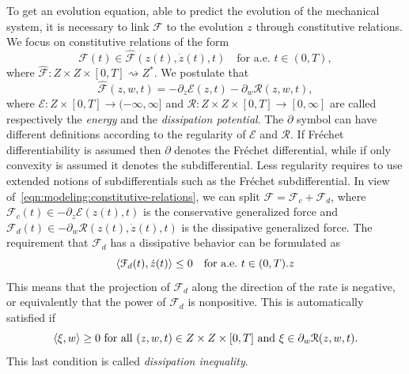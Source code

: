 \documentclass[a4paper,10pt,oneside]{amsbook}
\numberwithin{section}{chapter}
\numberwithin{equation}{chapter}
\theoremstyle{definition}
\DeclarePairedDelimiter{\dual}{\langle}{\rangle}
\begin{document}
To get an evolution equation, able to predict the evolution of the mechanical system, it is necessary to link $\mathcal{F}$ to the evolution $z$ through constitutive relations. We focus on constitutive relations of the form
\[
\mathcal{F}(t)\in\hat{\mathcal{F}}(z(t),\dot{z}(t),t)\quad\text{for a.e.\ $t\in(0,T)$},
\]
where $\hat{\mathcal{F}}\colon Z\times Z\times[0,T]\rightsquigarrow Z^*$. We postulate that
\begin{equation}
\label{eqn:modeling:constitutive-relations}
\hat{\mathcal{F}}(z,w,t)=-\partial_z\mathcal{E}(z,t)-\partial_w\mathcal{R}(z,w,t),
\end{equation}
where $\mathcal{E}\colon Z\times[0,T]\to(-\infty,\infty]$ and $\mathcal{R}\colon Z\times Z\times[0,T]\to[0,\infty]$ are called respectively the \emph{energy} and the \emph{dissipation potential}. The $\partial$ symbol can have different definitions according to the regularity of $\mathcal{E}$ and $\mathcal{R}$. If Fréchet differentiability is assumed then $\partial$ denotes the Fréchet differential, while if only convexity is assumed it denotes the subdifferential. Less regularity requires to use extended notions of subdifferentials such as the Fréchet subdifferential. In view of~\eqref{eqn:modeling:constitutive-relations}, we can split $\mathcal{F}=\mathcal{F}_c+\mathcal{F}_d$, where $\mathcal{F}_c(t)\in-\partial_z\mathcal{E}(z(t),t)$ is the conservative generalized force and $\mathcal{F}_d(t)\in-\partial_w\mathcal{R}(z(t),\dot{z}(t),t)$ is the dissipative generalized force. The requirement that $\mathcal{F}_d$ has a dissipative behavior can be formulated as
\[
\dual{\mathcal{F}_d(t),\dot{z}(t)}\le0\quad\text{for a.e.\ $t\in(0,T)$}.z
\]
This means that the projection of $\mathcal{F}_d$ along the direction of the rate is negative, or equivalently that the power of $\mathcal{F}_d$ is nonpositive. This is automatically satisfied if
\[
\text{$\dual{\xi,w}\ge0$ for all $(z,w,t)\in Z\times Z\times[0,T]$ and $\xi\in\partial_w\mathcal{R}(z,w,t)$}.
\]
This last condition is called \emph{dissipation inequality}.
\end{document}
